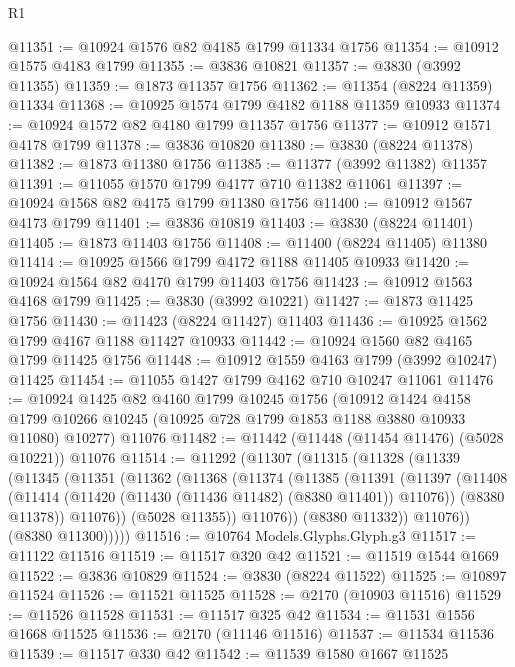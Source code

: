 \begin{lexlean}{R1}
\begin{coremodule}
@11351 := @10924 @1576 @82 @4185 @1799 @11334 @1756
@11354 := @10912 @1575 @4183 @1799
@11355 := @3836 @10821
@11357 := @3830 (@3992 @11355)
@11359 := @1873 @11357 @1756
@11362 := @11354 (@8224 @11359) @11334
@11368 := @10925 @1574 @1799 @4182 @1188 @11359 @10933
@11374 := @10924 @1572 @82 @4180 @1799 @11357 @1756
@11377 := @10912 @1571 @4178 @1799
@11378 := @3836 @10820
@11380 := @3830 (@8224 @11378)
@11382 := @1873 @11380 @1756
@11385 := @11377 (@3992 @11382) @11357
@11391 := @11055 @1570 @1799 @4177 @710 @11382 @11061
@11397 := @10924 @1568 @82 @4175 @1799 @11380 @1756
@11400 := @10912 @1567 @4173 @1799
@11401 := @3836 @10819
@11403 := @3830 (@8224 @11401)
@11405 := @1873 @11403 @1756
@11408 := @11400 (@8224 @11405) @11380
@11414 := @10925 @1566 @1799 @4172 @1188 @11405 @10933
@11420 := @10924 @1564 @82 @4170 @1799 @11403 @1756
@11423 := @10912 @1563 @4168 @1799
@11425 := @3830 (@3992 @10221)
@11427 := @1873 @11425 @1756
@11430 := @11423 (@8224 @11427) @11403
@11436 := @10925 @1562 @1799 @4167 @1188 @11427 @10933
@11442 := @10924 @1560 @82 @4165 @1799 @11425 @1756
@11448 := @10912 @1559 @4163 @1799 (@3992 @10247) @11425
@11454 := @11055 @1427 @1799 @4162 @710 @10247 @11061
@11476 := @10924
    @1425
    @82
    @4160
    @1799
    @10245
    @1756
    (@10912
      @1424
      @4158
      @1799
      @10266
      @10245
      (@10925 @728 @1799 @1853 @1188 @3880 @10933 @11080)
      @10277)
    @11076
@11482 := @11442 (@11448 (@11454 @11476) (@5028 @10221)) @11076
@11514 := @11292
    (@11307
      (@11315
        (@11328
          (@11339
            (@11345
              (@11351
                (@11362
                  (@11368
                    (@11374
                      (@11385
                        (@11391
                          (@11397
                            (@11408
                              (@11414 (@11420 (@11430 (@11436 @11482) (@8380 @11401)) @11076))
                              (@8380 @11378))
                            @11076))
                        (@5028 @11355))
                      @11076))
                  (@8380 @11332))
                @11076))
            (@8380 @11300)))))
@11516 := @10764 Models.Glyphs.Glyph.g3
@11517 := @11122 @11516
@11519 := @11517 @320 @42
@11521 := @11519 @1544 @1669
@11522 := @3836 @10829
@11524 := @3830 (@8224 @11522)
@11525 := @10897 @11524
@11526 := @11521 @11525
@11528 := @2170 (@10903 @11516)
@11529 := @11526 @11528
@11531 := @11517 @325 @42
@11534 := @11531 @1556 @1668 @11525
@11536 := @2170 (@11146 @11516)
@11537 := @11534 @11536
@11539 := @11517 @330 @42
@11542 := @11539 @1580 @1667 @11525

\end{coremodule}
\end{lexlean}
